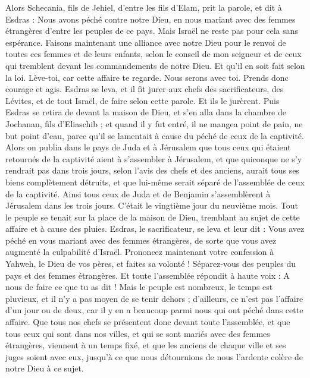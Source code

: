 \begin{multicols}{2}
Alors Schecania, fils de Jehiel, d'entre les fils d’Elam, prit la parole, et dit à Esdras : Nous avons péché contre notre Dieu, en nous mariant avec des femmes étrangères d'entre les peuples de ce pays. Mais Israël ne reste pas pour cela sans espérance.
Faisons maintenant une alliance avec notre Dieu pour le renvoi de toutes ces femmes et de leurs enfants, selon le conseil de mon seigneur et de ceux qui tremblent devant les commandements de notre Dieu. Et qu'il en soit fait selon la loi.
Lève-toi, car cette affaire te regarde. Nous serons avec toi. Prends donc courage et agis.
Esdras se leva, et il fit jurer aux chefs des sacrificateurs, des Lévites, et de tout Israël, de faire selon cette parole. Et ils le jurèrent.
Puis Esdras se retira de devant la maison de Dieu, et s'en alla dans la chambre de Jochanan, fils d'Eliaschib ; et quand il y fut entré, il ne mangea point de pain, ne but point d'eau, parce qu'il se lamentait à cause du péché de ceux de la captivité.
Alors on publia dans le pays de Juda et à Jérusalem que tous ceux qui étaient retournés de la captivité aient à s'assembler à Jérusalem,
et que quiconque ne s'y rendrait pas dans trois jours, selon l'avis des chefs et des anciens, aurait tous ses biens complètement détruits, et que lui-même serait séparé de l'assemblée de ceux de la captivité.
Ainsi tous ceux de Juda et de Benjamin s'assemblèrent à Jérusalem dans les trois jours. C’était le vingtième jour du neuvième mois. Tout le peuple se tenait sur la place de la maison de Dieu, tremblant au sujet de cette affaire et à cause des pluies.
Esdras, le sacrificateur, se leva et leur dit : Vous avez péché en vous mariant avec des femmes étrangères, de sorte que vous avez augmenté la culpabilité d'Israël.
Prononcez maintenant votre confession à Yahweh, le Dieu de vos pères, et faites sa volonté ! Séparez-vous des peuples du pays et des femmes étrangères.
Et toute l'assemblée répondit à haute voix : A nous de faire ce que tu as dit !
Mais le peuple est nombreux, le temps est pluvieux, et il n'y a pas moyen de se tenir dehors ; d’ailleurs, ce n’est pas l’affaire d’un jour ou de deux, car il y en a beaucoup parmi nous qui ont péché dans cette affaire.
Que tous nos chefs se présentent donc devant toute l'assemblée, et que tous ceux qui sont dans nos villes, et qui se sont mariés avec des femmes étrangères, viennent à un temps fixé, et que les anciens de chaque ville et ses juges soient avec eux, jusqu'à ce que nous détournions de nous l'ardente colère de notre Dieu à ce sujet.

\end{multicols}

